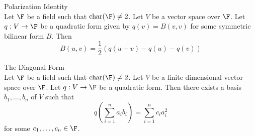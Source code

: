 \documentclass[a4paper]{article}
\begin{document}
\begin{lmm}{Polarization Identity}{}\\
Let $\F$ be a field such that $\text{char}(\F)\neq 2$. Let $V$ be a vector space over $\F$. Let $q:V\to\F$ be a quadratic form given by $q(v)=B(v,v)$ for some symmetric bilinear form $B$. Then $$B(u,v)=\frac{1}{2}\left(q(u+v)-q(u)-q(v)\right)$$
\end{lmm}

\begin{thm}{The Diagonal Form}{}\\
Let $\F$ be a field such that $\text{char}(\F)\neq 2$. Let $V$ be a finite dimensional vector space over $\F$. Let $q:V\to\F$ be a quadratic form. Then there exists a basis $b_1,\dots,b_n$ of $V$ such that $$q\left(\sum_{i=1}^na_ib_i\right)=\sum_{i=1}^nc_ia_i^2$$ for some $c_1,\dots,c_n\in\F$. 
\end{thm}
\end{document}
